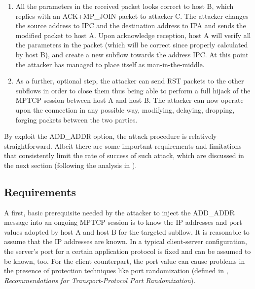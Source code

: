 \begin{enumerate}
\item All the parameters in the received packet looks correct to host B, which replies with an ACK+MP\_JOIN packet to attacker C. The attacker changes the source address to IPC and the destination address to IPA and sends the modified packet to host A. Upon acknowledge reception, host A will verify all the parameters in the packet (which will be correct since properly calculated by host B), and create a new subflow towards the address IPC. At this point the attacker has managed to place itself as man-in-the-middle.

\item As a further, optional step, the attacker can send RST packets to the other subflows in order to close them thus being able to perform a full hijack of the MPTCP session between host A and host B. The attacker can now operate upon the connection in any possible way, modifying, delaying, dropping, forging packets between the two parties.
\end{enumerate}

By exploit the ADD\_ADDR option, the attack procedure is relatively straightforward. Albeit there are some important requirements and limitations that consistently limit the rate of success of such attack, which are discussed in the next section (following the analysis in ).

\subsection{Requirements}
A first, basic prerequisite needed by the attacker to inject the ADD\_ADDR message into an ongoing MPTCP session is to know the IP addresses and port values adopted by host A and host B for the targeted subflow. It is reasonable to assume that the IP addresses are known. In a typical client-server configuration, the server's port for a certain application protocol is fixed and can be assumed to be known, too. For the client counterpart, the port value can cause problems in the presence of protection techniques like port randomization (defined in , \textit{Recommendations for Transport-Protocol Port Randomization}).

